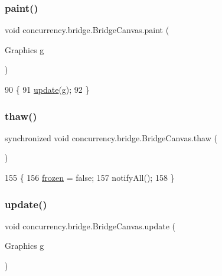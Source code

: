 \subsubsection{\texorpdfstring{paint()}{paint()}}
{\footnotesize\ttfamily void concurrency.\+bridge.\+Bridge\+Canvas.\+paint (\begin{DoxyParamCaption}\item[{Graphics}]{g }\end{DoxyParamCaption})\hspace{0.3cm}{\ttfamily [inline]}}


\begin{DoxyCode}
90                                   \{
91          \mbox{\hyperlink{classconcurrency_1_1bridge_1_1_bridge_canvas_a3cdc761a16dc589c729d515abbd772b9}{update}}(g);
92     \}
\end{DoxyCode}
\mbox{\label{classconcurrency_1_1bridge_1_1_bridge_canvas_af3ce80d4ece527c54b0e7eb74ce75af4}} 
\subsubsection{\texorpdfstring{thaw()}{thaw()}}
{\footnotesize\ttfamily synchronized void concurrency.\+bridge.\+Bridge\+Canvas.\+thaw (\begin{DoxyParamCaption}{ }\end{DoxyParamCaption})\hspace{0.3cm}{\ttfamily [inline]}}


\begin{DoxyCode}
155                                     \{
156         \mbox{\hyperlink{classconcurrency_1_1bridge_1_1_bridge_canvas_a1f2ccdf0586d82761c1c372e24643c0e}{frozen}} = \textcolor{keyword}{false};
157         notifyAll();
158     \}
\end{DoxyCode}
\mbox{\label{classconcurrency_1_1bridge_1_1_bridge_canvas_a3cdc761a16dc589c729d515abbd772b9}} 
\subsubsection{\texorpdfstring{update()}{update()}}
{\footnotesize\ttfamily void concurrency.\+bridge.\+Bridge\+Canvas.\+update (\begin{DoxyParamCaption}\item[{Graphics}]{g }\end{DoxyParamCaption})\hspace{0.3cm}{\ttfamily [inline]}}


